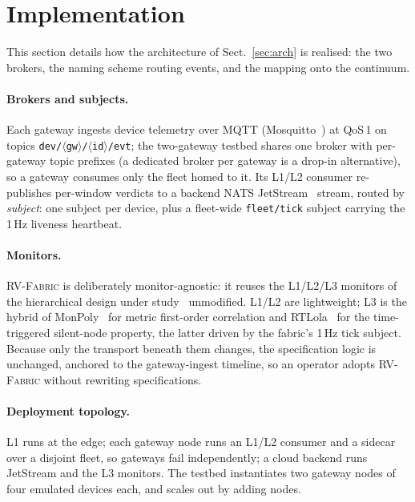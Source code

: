 \documentclass[runningheads]{llncs}
\newcommand{\sys}{\textsc{RV-Fabric}\xspace}
\begin{document}
\section{Implementation}
\label{sec:impl}
This section details how the architecture of Sect.~\ref{sec:arch} is realised: the two
brokers, the naming scheme routing events, and the mapping onto the continuum.

\paragraph{Brokers and subjects.}
Each gateway ingests device telemetry over MQTT (Mosquitto~\cite{mosquitto}) at QoS\,1
on topics \texttt{dev/$\langle$gw$\rangle$/$\langle$id$\rangle$/evt}; the two-gateway
testbed shares one broker with per-gateway topic prefixes (a dedicated broker per gateway
is a drop-in alternative), so a gateway consumes only the fleet homed to it. Its L1/L2
consumer re-publishes per-window verdicts to a backend NATS JetStream~\cite{nats} stream,
routed by \emph{subject}: one subject per device, plus a fleet-wide \texttt{fleet/tick}
subject carrying the 1\,Hz liveness heartbeat.

\paragraph{Monitors.}
\sys is deliberately monitor-agnostic: it reuses the L1/L2/L3 monitors of the
hierarchical design under study~\cite{ares2026,csr2026} unmodified. L1/L2 are
lightweight; L3 is the hybrid of MonPoly~\cite{monpoly} for metric first-order
correlation and RTLola~\cite{rtlola} for the time-triggered silent-node property, the
latter driven by the fabric's 1\,Hz tick subject. Because only the transport beneath them
changes, the specification logic is unchanged, anchored to the gateway-ingest
timeline, so an operator adopts \sys without rewriting specifications.

\paragraph{Deployment topology.}
L1 runs at the edge; each gateway node runs an L1/L2 consumer and a sidecar over a
disjoint fleet, so gateways fail independently; a cloud
backend runs JetStream and the L3 monitors. The testbed instantiates two gateway nodes of
four emulated devices each, and scales out by adding nodes.
\end{document}
